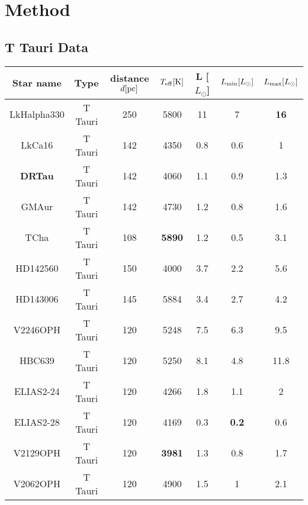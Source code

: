 \chapter{Method}

\section{T Tauri Data}

\begin{table}[h!]
	\begin{center}
 		\begin{tabular}{|c | c | c | c| c| c| c|} 
		\hline
		Star name	& Type & distance $d [\rm{pc}]$ & $T_{\rm{eff}} \rm{[K]}$	 &	L [$L_\odot$] & 	$L_{\rm{min}} [L_\odot]$ 	&$L_{\rm{max}} [L_\odot]$ \\
		\hline
		\rowcolor{LightCyan}LkHalpha330        &   T Tauri      &   250   &    5800    &     11     &     7   &      \textbf{16} \\
		LkCa16             &   T Tauri     &    142   &    4350   &     0.8   &     0.6   &       1 \\
		\rowcolor{SwampGreen} \textbf{DRTau}              &   T Tauri     &    142   &    4060   &     1.1   &     0.9   &     1.3 \\
		GMAur              &   T Tauri     &    142   &    4730   &     1.2   &     0.8   &     1.6 \\
		\rowcolor{LightCyan} TCha               &   T Tauri     &    108   &    \textbf{5890}    &    1.2   &     0.5    &    3.1 \\
		HD142560           &   T Tauri     &    150   &    4000    &    3.7   &     2.2    &    5.6 \\
		HD143006           &   T Tauri     &    145   &    5884    &    3.4   &     2.7    &    4.2 \\
		V2246OPH           &   T Tauri     &    120   &    5248    &    7.5   &     6.3    &    9.5 \\
		HBC639             &   T Tauri     &    120   &    5250    &    8.1   &     4.8    &   11.8 \\
		ELIAS2-24          &   T Tauri     &    120   &    4266    &    1.8   &     1.1    &      2 \\
		\rowcolor{LightCyan} ELIAS2-28          &   T Tauri     &    120   &    4169    &    0.3   &     \textbf{0.2}    &    0.6 \\
		\rowcolor{LightCyan} V2129OPH           &   T Tauri     &    120   &    \textbf{3981}     &   1.3   &     0.8   &     1.7 \\
		V2062OPH           &   T Tauri    &     120   &    4900    &    1.5    &      1   &     2.1 \\
		\hline		
		\end{tabular}
	\end{center}
\end{table}

